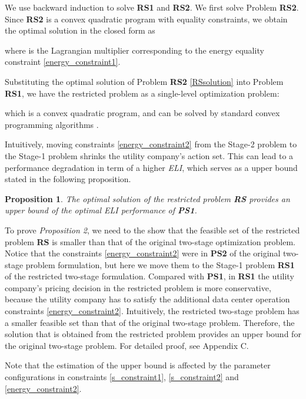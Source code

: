 \documentclass[journal]{IEEEtran}
\newtheorem{proposition}{Proposition}
\begin{document}
	
	
	
	
	We use backward induction to solve \textbf{RS1} and \textbf{RS2}. We first solve Problem \textbf{RS2}. Since \textbf{RS2} is a convex quadratic program with equality constraints, we obtain the optimal solution in the closed form as
	
	where  is the Lagrangian multiplier corresponding to the energy equality constraint \eqref{energy_constraint1}.
	
	Substituting the optimal solution of Problem \textbf{RS2} \eqref{RSsolution} into Problem \textbf{RS1}, we have the restricted problem as a single-level optimization problem:
	
	
	which is a convex quadratic program, and can be solved by standard convex programming algorithms \cite{convex}.
	
	
	Intuitively, moving constraints \eqref{energy_constraint2} from the Stage-2 problem to the Stage-1 problem shrinks the utility company's action set. This can lead to a performance degradation in term of a higher \emph{ELI}, which serves as a upper bound stated in the following proposition.
	\begin{proposition}\label{upperbound}
		The optimal solution of the restricted problem \textbf{RS} provides an upper bound of the optimal \emph{ELI} performance of \textbf{PS1}.
	\end{proposition}
	
	To prove \emph{Proposition 2}, we need to the show that the feasible set of the restricted problem \textbf{RS} is smaller than that of the original two-stage optimization problem. Notice that the constraints \eqref{energy_constraint2} were in \textbf{PS2} of the original two-stage problem formulation, but here we move them to the Stage-1 problem \textbf{RS1} of the restricted two-stage formulation. Compared with \textbf{PS1}, in \textbf{RS1} the utility company's pricing decision in the restricted problem is more conservative, because the utility company has to satisfy the additional data center operation constraints \eqref{energy_constraint2}. Intuitively, the restricted two-stage problem has a smaller feasible set than that of the original two-stage problem. Therefore, the solution that is obtained from the restricted problem provides an upper bound for the original two-stage problem. For detailed proof, see Appendix C.
	
	Note that the estimation of the upper bound is affected by the parameter configurations in constraints \eqref{s_constraint1}, \eqref{s_constraint2} and \eqref{energy_constraint2}.
\end{document}
